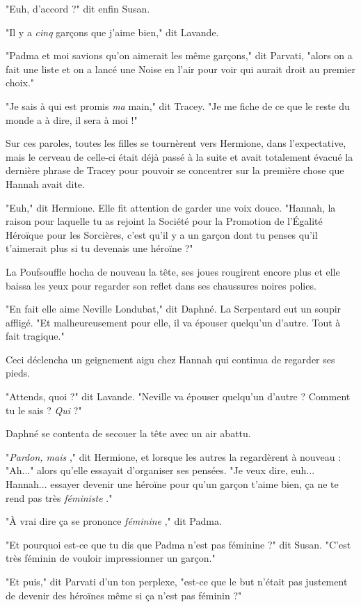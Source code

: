 "Euh, d'accord ?" dit enfin Susan.

"Il y a \emph{cinq}  garçons que j'aime bien," dit Lavande.

"Padma et moi savions qu'on aimerait les même garçons," dit Parvati, "alors on a fait une liste et on a lancé une Noise en l'air pour voir qui aurait droit au premier choix."

"Je sais à qui est promis \emph{ma}  main," dit Tracey. "Je me fiche de ce que le reste du monde a à dire, il sera à moi !"

Sur ces paroles, toutes les filles se tournèrent vers Hermione, dans l'expectative, mais le cerveau de celle-ci était déjà passé à la suite et avait totalement évacué la dernière phrase de Tracey pour pouvoir se concentrer sur la première chose que Hannah avait dite.

"Euh," dit Hermione. Elle fit attention de garder une voix douce. "Hannah, la raison pour laquelle tu as rejoint la Société pour la Promotion de l'Égalité Héroïque pour les Sorcières, c'est qu'il y a un garçon dont tu penses qu'il t'aimerait plus si tu devenais une héroïne ?"

La Poufsouffle hocha de nouveau la tête, ses joues rougirent encore plus et elle baissa les yeux pour regarder son reflet dans ses chaussures noires polies.

"En fait elle aime Neville Londubat," dit Daphné. La Serpentard eut un soupir affligé. "Et malheureusement pour elle, il va épouser quelqu'un d'autre. Tout à fait tragique."

Ceci déclencha un geignement aigu chez Hannah qui continua de regarder ses pieds.

"Attends, quoi ?" dit Lavande. "Neville va épouser quelqu'un d'autre ? Comment tu le sais ? \emph{Qui}  ?"

Daphné se contenta de secouer la tête avec un air abattu.

"\emph{Pardon, mais} ," dit Hermione, et lorsque les autres la regardèrent à nouveau : "Ah..." alors qu'elle essayait d'organiser ses pensées. "Je veux dire, euh... Hannah... essayer devenir une héroïne pour qu'un garçon t'aime bien, ça ne te rend pas très \emph{féministe} ."

"À vrai dire ça se prononce \emph{féminine} ," dit Padma.

"Et pourquoi est-ce que tu dis que Padma n'est pas féminine ?" dit Susan. "C'est très féminin de vouloir impressionner un garçon."

"Et puis," dit Parvati d'un ton perplexe, "est-ce que le but n'était pas justement de devenir des héroïnes même si ça n'est pas féminin ?"

